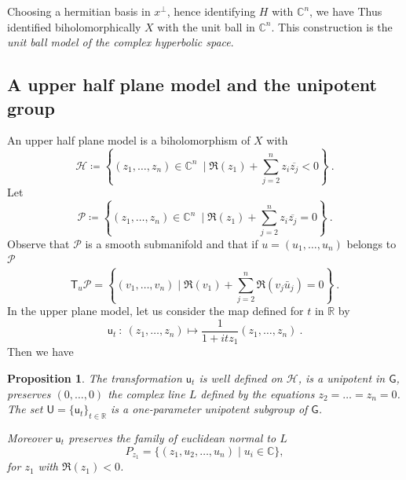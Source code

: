 \documentclass[12pt,reqno]{amsart}
\newtheorem{proposition}[theorem]{Proposition}
\newcommand{\T}{\ms T}
\newcommand{\mG}{\ms G}
\newcommand{\ms}{\mathsf}
\newcommand{\mc}{\mathcal}
\newcommand{\defeq}{\coloneqq}
\newcommand{\uu}{\mathsf u}
\newcommand{\mU}{\mathsf U}
\newcommand{\seqt}[1]{ \{{#1}\}_{t\in\mathbb R}}
\begin{document}
Choosing a hermitian basis in $x^\perp$, hence identifying $H$ with $\mathbb C^n$, we have Thus identified biholomorphically $X$ with the unit ball in $\mathbb C^n$. This construction is the {\em unit ball model of the complex hyperbolic space}.
  
\subsection{A upper half plane model and the unipotent group}

An upper half plane model is a biholomorphism of $X$ with 
$$
\mathcal H\defeq \left\{(z_1,\ldots,z_n)\in\mathbb C^n\ \mid \Re(z_1)+\sum_{j=2}^n z_i\overline{z_j}<0\right\}\ .
$$
Let 
$$
\mathcal P\defeq \left\{(z_1,\ldots,z_n)\in \mathbb C^n\ \mid \Re(z_1)+\sum_{j=2}^n z_i\overline{z_j}=0\right\}\ .
$$
Observe that $\mathcal P$ is a smooth submanifold and that if $u=(u_1,\ldots, u_n)$ belongs to $\mc P$
$$
\T_u\mathcal P=\left\{(v_1,\ldots,v_n)\mid \Re(v_1)+\sum_{j=2}^n \Re(v_j\bar u_j)=0\right\} \ .
$$
In the upper plane model, let us consider the
map defined for $t$ in $\mathbb R$ by 
$$\uu_t\ :\ (z_1,\ldots,z_n)\mapsto\frac{1}{1+itz_1}(z_1,\ldots,z_n)\ .
$$
Then we have
\begin{proposition}\label{pro:unip}
	The transformation $\uu_t$ is well defined on $\mc H$, is a unipotent in $\mG$, preserves $(0,\ldots,0)$ the complex line $L$ defined by the equations $z_2=\ldots=z_n=0$. The set $\mU=\seqt{\uu_t}$ is a one-parameter unipotent subgroup of $\mG$.
	
	Moreover $\uu_t$ preserves the family of euclidean normal to $L$
	$$
	P_{z_1}=\{(z_1,u_2,\ldots,u_n)\mid u_i\in \mathbb C\},
	$$
	for $z_1$ with $\Re(z_1)<0$.
\end{proposition}
\end{document}
